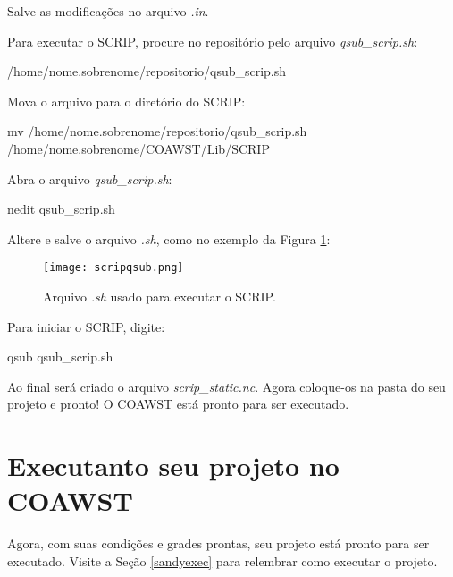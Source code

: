 \noindent Salve as modificações no arquivo \textit{.in}.
\bigskip

\noindent Para executar o SCRIP, procure no repositório pelo arquivo \textit{qsub\_scrip.sh}:
\bigskip

\begin{bashcode}
/home/nome.sobrenome/repositorio/qsub_scrip.sh
\end{bashcode}
\bigskip

\noindent Mova o arquivo para o diretório do SCRIP:
\bigskip

\begin{bashcode}[fontsize=\scriptsize]
mv /home/nome.sobrenome/repositorio/qsub_scrip.sh /home/nome.sobrenome/COAWST/Lib/SCRIP
\end{bashcode}
\bigskip

\noindent Abra o arquivo \textit{qsub\_scrip.sh}:
\bigskip

\begin{bashcode}
nedit qsub_scrip.sh
\end{bashcode}
\bigskip

\noindent Altere e salve o arquivo \textit{.sh}, como no exemplo da Figura \textcolor{bleu_cite}{\ref{qsubscripsh}}:
\bigskip

\begin{figure}[H]
    \centering
    \texttt{[image: scripqsub.png]}
    \caption{Arquivo \textit{.sh} usado para executar o SCRIP.}
    \label{qsubscripsh}
\end{figure}
\bigskip

\noindent Para iniciar o SCRIP, digite:
\bigskip

\begin{bashcode}
qsub qsub_scrip.sh
\end{bashcode}
\bigskip

\noindent Ao final será criado o arquivo \textit{scrip\_static.nc}. Agora coloque-os na pasta do seu projeto e pronto! O COAWST está pronto para ser executado.
\bigskip

\section{Executanto seu projeto no COAWST}
\bigskip

\noindent Agora, com suas condições e grades prontas, seu projeto está pronto para ser executado. Visite a Seção \textcolor{bleu_cite}{\ref{sandyexec}} para relembrar como executar o projeto.

